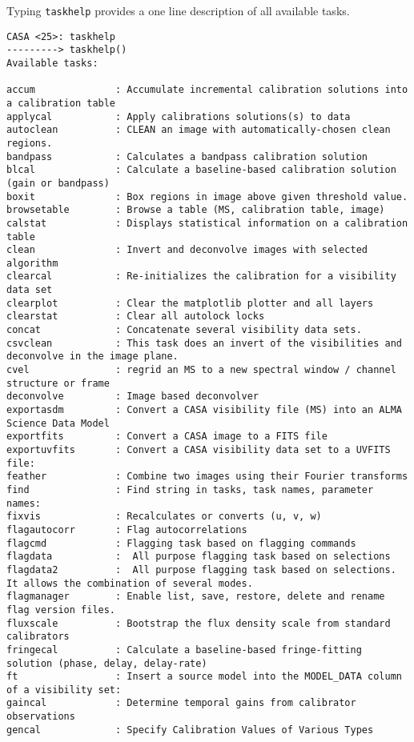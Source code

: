 Typing {\tt taskhelp} provides a one line description of all available
tasks.
\small
\begin{verbatim}
CASA <25>: taskhelp
---------> taskhelp()
Available tasks: 

accum              : Accumulate incremental calibration solutions into a calibration table
applycal           : Apply calibrations solutions(s) to data
autoclean          : CLEAN an image with automatically-chosen clean regions.
bandpass           : Calculates a bandpass calibration solution
blcal              : Calculate a baseline-based calibration solution (gain or bandpass)
boxit              : Box regions in image above given threshold value.
browsetable        : Browse a table (MS, calibration table, image)
calstat            : Displays statistical information on a calibration table
clean              : Invert and deconvolve images with selected algorithm
clearcal           : Re-initializes the calibration for a visibility data set
clearplot          : Clear the matplotlib plotter and all layers
clearstat          : Clear all autolock locks
concat             : Concatenate several visibility data sets.
csvclean           : This task does an invert of the visibilities and deconvolve in the image plane.
cvel               : regrid an MS to a new spectral window / channel structure or frame
deconvolve         : Image based deconvolver
exportasdm         : Convert a CASA visibility file (MS) into an ALMA Science Data Model
exportfits         : Convert a CASA image to a FITS file
exportuvfits       : Convert a CASA visibility data set to a UVFITS file:
feather            : Combine two images using their Fourier transforms
find               : Find string in tasks, task names, parameter names:
fixvis             : Recalculates or converts (u, v, w)
flagautocorr       : Flag autocorrelations
flagcmd            : Flagging task based on flagging commands
flagdata           :  All purpose flagging task based on selections
flagdata2          :  All purpose flagging task based on selections. It allows the combination of several modes.
flagmanager        : Enable list, save, restore, delete and rename flag version files.
fluxscale          : Bootstrap the flux density scale from standard calibrators
fringecal          : Calculate a baseline-based fringe-fitting solution (phase, delay, delay-rate)
ft                 : Insert a source model into the MODEL_DATA column of a visibility set:
gaincal            : Determine temporal gains from calibrator observations
gencal             : Specify Calibration Values of Various Types

\end{verbatim}
